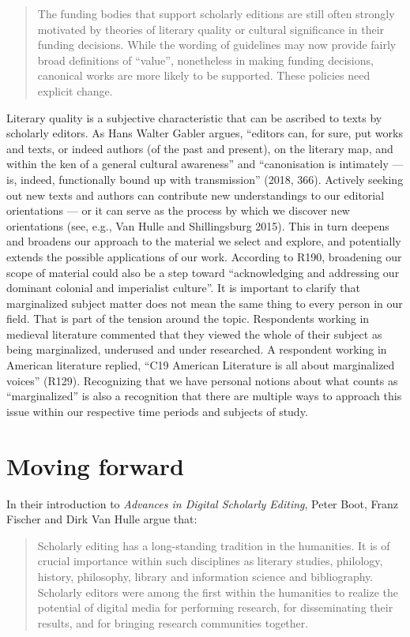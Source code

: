 \begin{paper}
\begin{quote}
The funding bodies that support scholarly editions are still often
strongly motivated by theories of literary quality or cultural
significance in their funding decisions. While the wording of guidelines
may now provide fairly broad definitions of ``value'', nonetheless in
making funding decisions, canonical works are more likely to be
supported. These policies need explicit change.
\end{quote}
Literary quality is a subjective characteristic that can be ascribed to
texts by scholarly editors. As Hans Walter Gabler argues, ``editors can,
for sure, put works and texts, or indeed authors (of the past and
present), on the literary map, and within the ken of a general cultural
awareness'' and ``canonisation is intimately --- is, indeed,
functionally bound up with transmission'' (2018, 366). Actively seeking
out new texts and authors can contribute new understandings to our
editorial orientations --- or it can serve as the process by which we
discover new orientations (see, e.g., Van Hulle and Shillingsburg 2015).
This in turn deepens and broadens our approach to the material we select
and explore, and potentially extends the possible applications of our
work. According to R190, broadening our scope of material could also be
a step toward ``acknowledging and addressing our dominant colonial and
imperialist culture''. It is important to clarify that marginalized
subject matter does not mean the same thing to every person in our
field. That is part of the tension around the topic. Respondents working
in medieval literature commented that they viewed the whole of their
subject as being marginalized, underused and under researched. A
respondent working in American literature replied, ``C19 American
Literature is all about marginalized voices'' (R129). Recognizing that
we have personal notions about what counts as ``marginalized'' is also a
recognition that there are multiple ways to approach this issue within
our respective time periods and subjects of study.
\section*{Moving forward}

In their introduction to \emph{Advances in Digital Scholarly Editing},
Peter Boot, Franz Fischer and Dirk Van Hulle argue that:

\begin{quote}
Scholarly editing has a long-standing tradition in the humanities. It is
of crucial importance within such disciplines as literary studies,
philology, history, philosophy, library and information science and
bibliography. Scholarly editors were among the first within the
humanities to realize the potential of digital media for performing
research, for disseminating their results, and for bringing research
communities together.


\end{quote}
\end{paper}
